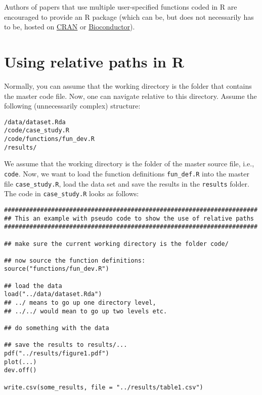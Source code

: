 \documentclass[12pt,a4paper]{article}
\begin{document}
Authors of papers that use multiple user-specified functions coded in \textsf{R}
are encouraged to provide an \textsf{R} package (which can be, but does not
necessarily has to be, hosted on \href{http://cran.r-project.org/}{CRAN} or
\href{http://bioconductor.org/}{Bioconductor}).





\clearpage
\appendix
\section{Using relative paths in R}
\label{sec:using-relative-paths}

Normally, you can assume that the working directory is the folder that contains
the master code file. Now, one can navigate relative to this directory. Assume
the following (unnecessarily complex) structure:

\begin{verbatim}
/data/dataset.Rda
/code/case_study.R
/code/functions/fun_dev.R
/results/
\end{verbatim}

We assume that the working directory is the folder of the master source
file, i.e., \texttt{code}. Now, we want to load the function definitions
\texttt{fun\_def.R} into the master file \texttt{case\_study.R}, load the
data set and save the results in the \texttt{results} folder. The code in
\texttt{case\_study.R} looks as follows:

\begin{Verbatim}[frame=single]
######################################################################
## This an example with pseudo code to show the use of relative paths
######################################################################

## make sure the current working directory is the folder code/

## now source the function definitions:
source("functions/fun_dev.R")

## load the data
load("../data/dataset.Rda")
## ../ means to go up one directory level,
## ../../ would mean to go up two levels etc.

## do something with the data

## save the results to results/...
pdf("../results/figure1.pdf")
plot(...)
dev.off()

write.csv(some_results, file = "../results/table1.csv")
\end{Verbatim}
\end{document}
